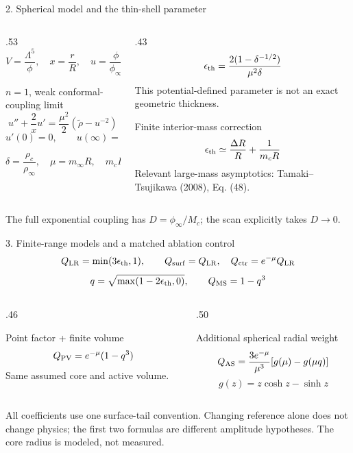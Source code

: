 \documentclass[10pt,aspectratio=169]{beamer}
\begin{document}
\begin{frame}{2. Spherical model and the thin-shell parameter}
 \begin{columns}[T,onlytextwidth]
 \begin{column}{.53\textwidth}
  \[V=\frac{\Lambda^5}{\phi},\quad x=\frac rR,\quad u=\frac\phi{\phi_\infty}\]
  \begin{block}{$n=1$, weak conformal-coupling limit}
   \[u''+\frac2x u'=\frac{\mu^2}{2}(\widetilde\rho-u^{-2})\]
   \[u'(0)=0,\qquad u(\infty)=1\]
  \end{block}
  \[\delta=\frac{\rho_c}{\rho_\infty},\quad \mu=m_\infty R,\quad m_cR=\mu\delta^{3/4}\]
 \end{column}
 \begin{column}{.43\textwidth}
  \[\epsilon_{\mathrm{th}}=\frac{2(1-\delta^{-1/2})}{\mu^2\delta}\]
  \small This potential-defined parameter is not an exact geometric thickness.
  \begin{block}{Finite interior-mass correction}
   \[\epsilon_{\mathrm{th}}\simeq\frac{\Delta R}{R}+\frac1{m_cR}\]
   \scriptsize Relevant large-mass asymptotics: Tamaki--Tsujikawa (2008), Eq. (48).
  \end{block}
 \end{column}
 \end{columns}
 \vfill\scriptsize\color{graytext}
 The full exponential coupling has $D=\phi_\infty/M_c$; the scan explicitly takes $D\to0$.
\end{frame}

\begin{frame}{3. Finite-range models and a matched ablation control}
 \small
 \[Q_{\mathrm{LR}}=\min(3\epsilon_{\mathrm{th}},1),\qquad Q_{\mathrm{surf}}=Q_{\mathrm{LR}},\quad Q_{\mathrm{ctr}}=e^{-\mu}Q_{\mathrm{LR}}\]
 \[q=\sqrt{\max(1-2\epsilon_{\mathrm{th}},0)},\qquad Q_{\mathrm{MS}}=1-q^3\]
 \begin{columns}[T,onlytextwidth]
 \begin{column}{.46\textwidth}
  \begin{block}{Point factor + finite volume}
   \[Q_{\mathrm{PV}}=e^{-\mu}(1-q^3)\]
   Same assumed core and active volume.
  \end{block}
 \end{column}
 \begin{column}{.50\textwidth}
  \begin{block}{Additional spherical radial weight}
   \[Q_{\mathrm{AS}}=\frac{3e^{-\mu}}{\mu^3}[g(\mu)-g(\mu q)]\]
   \[g(z)=z\cosh z-\sinh z\]
  \end{block}
 \end{column}
 \end{columns}
 \vfill\scriptsize
 All coefficients use one surface-tail convention. Changing reference alone does not change physics;
 the first two formulas are different amplitude hypotheses. The core radius is modeled, not measured.
\end{frame}
\end{document}
